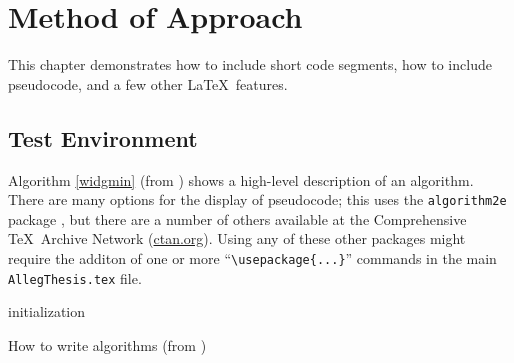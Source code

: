 %
%
%
\chapter{Method of Approach} \label{ch:method}
This chapter demonstrates how to include short code segments,
how to include pseudocode, and a few other \LaTeX\ features.

\section{Test Environment}
Algorithm \ref{widgmin} (from ) shows a high-level description of an
algorithm. There are many options for the display of
pseudocode; this uses the {\tt algorithm2e} package , 
but there are a number of others available at the Comprehensive \TeX\ Archive
Network (\url{ctan.org}). Using any of these
other packages might require the additon of one or more
``\verb$\usepackage{...}$'' commands in the main {\tt AllegThesis.tex} file.


\begin{algorithm}[htbp]
 \SetAlgoLined %
 initialization\;
 \caption{How to write algorithms (from )}
\label{widgmin}
\end{algorithm}


